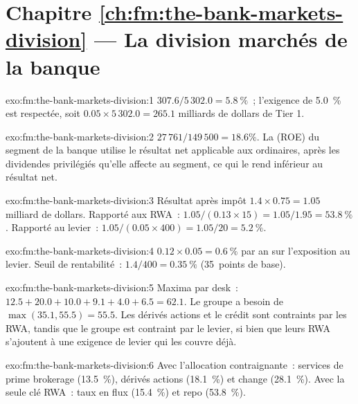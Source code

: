 \section*{Chapitre \ref{ch:fm:the-bank-markets-division} --- La division marchés de la banque}

\begin{solution}{exo:fm:the-bank-markets-division:1}
$307.6/5\,302.0=5.8~\%$~; l'exigence de 5.0~\% est respectée, soit $0.05\times5\,302.0=265.1$ milliards de dollars de Tier 1.
\end{solution}

\begin{solution}{exo:fm:the-bank-markets-division:2}
$27\,761/149\,500=18.6\%$. La  (ROE) du segment de la banque utilise le résultat net applicable aux  ordinaires, après les dividendes privilégiés qu'elle affecte
au segment, ce qui le rend inférieur au résultat net.
\end{solution}

\begin{solution}{exo:fm:the-bank-markets-division:3}
Résultat après impôt $1.4\times0.75=1.05$ milliard de dollars. Rapporté aux RWA~: $1.05/(0.13\times15)=1.05/1.95=53.8~\%$. Rapporté au levier~: $1.05/(0.05\times400)=1.05/20=5.2~\%$.
\end{solution}

\begin{solution}{exo:fm:the-bank-markets-division:4}
$0.12\times0.05=0.6~\%$ par an sur l'exposition au levier. Seuil de rentabilité~: $1.4/400=0.35~\%$ (35~points de base).
\end{solution}

\begin{solution}{exo:fm:the-bank-markets-division:5}
Maxima par desk~: $12.5+20.0+10.0+9.1+4.0+6.5=62.1$. Le groupe a besoin de $\max(35.1, 55.5)=55.5$. Les dérivés actions et le crédit sont contraints par les RWA, tandis que le
groupe est contraint par le levier, si bien que leurs  RWA s'ajoutent à une exigence de levier qui les couvre déjà.
\end{solution}

\begin{solution}{exo:fm:the-bank-markets-division:6}
Avec l'allocation contraignante~: services de prime brokerage (13.5~\%), dérivés actions (18.1~\%) et change (28.1~\%). Avec la seule clé RWA~: taux en flux (15.4~\%) et
repo (53.8~\%).
\end{solution}


